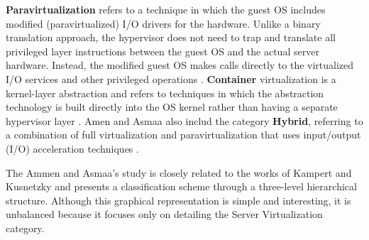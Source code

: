     
    \textbf{Paravirtualization} refers to a technique in which the guest OS includes modified (paravirtualized) I/O drivers for the hardware. Unlike a binary translation approach, the hypervisor does not need to trap and translate all privileged layer instructions between the guest OS and the actual server hardware. Instead, the modified guest OS makes calls directly to the virtualized I/O services and other privileged operations \cite{Ameen2013, VonHagen2008}. \textbf{Container} virtualization is a kernel-layer abstraction and refers to  techniques in which the abstraction technology is built directly into the OS kernel rather than having a separate hypervisor layer \cite{Ameen2013, Lin2012}. Amen and Asmaa also includ the category \textbf{Hybrid}, referring to a combination of full virtualization and paravirtualization that uses input/output (I/O) acceleration techniques \cite{Ameen2013, White2010}.

    
    
    The Ammen and Asmaa's study is closely related to the works of Kampert \cite{Kampert2010} and Kusnetzky \cite{Kusnetzky2011} and presents a classification scheme through a three-level hierarchical structure. Although this graphical representation is simple and interesting, it is unbalanced because it focuses only on detailing the Server Virtualization category.




